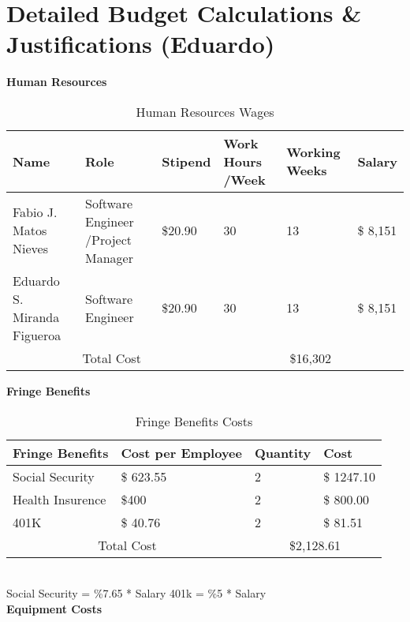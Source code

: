  \section{Detailed Budget Calculations \& Justifications (Eduardo)}
\begin{table}[h]
    \centering
    \textbf{Human Resources}
    \begin{tabular}{||m{}|m{}|m{}|m{}|m{}|m{}||}
     \hline
     Name & Role & Stipend & Work Hours /Week & Working Weeks & Salary\\
     \hline
     Fabio J. Matos Nieves & Software Engineer /Project Manager& \$20.90 & 30 & 13 & \$ 8,151\\ 
     \hline
     Eduardo S. Miranda Figueroa & Software Engineer & \$20.90 & 30 & 13 & \$ 8,151 \\
    
     \hline
     \multicolumn{3}{||c|}{Total Cost} & \multicolumn{3}{c||}{\$16,302}\\
     \hline
    \end{tabular}
    \caption {Human Resources Wages}
    \label{table:2}
\end{table}
\textbf{Fringe Benefits\cite{WhatAreFringe}}
\begin{table}[h]
    \begin{tabular}{||m{}|m{}|m{}|m{}||}
        \hline
        Fringe Benefits & Cost per Employee & Quantity & Cost\\
        \hline
        Social Security &  \$ 623.55 & 2 & \$ 1247.10\\ 
        \hline
        Health Insurence & \$400 & 2 & \$ 800.00 \\
        401K & \$ 40.76 & 2 & \$ 81.51\\ 

        \hline
        \multicolumn{2}{||c|}{Total Cost} & \multicolumn{2}{c||}{\$2,128.61}\\
        \hline
       \end{tabular}
       \caption {Fringe Benefits Costs}
       \label{table:3}
\end{table}\\
Social Security = \%7.65 * Salary
401k = \%5 * Salary\\
\textbf{Equipment Costs}\\
